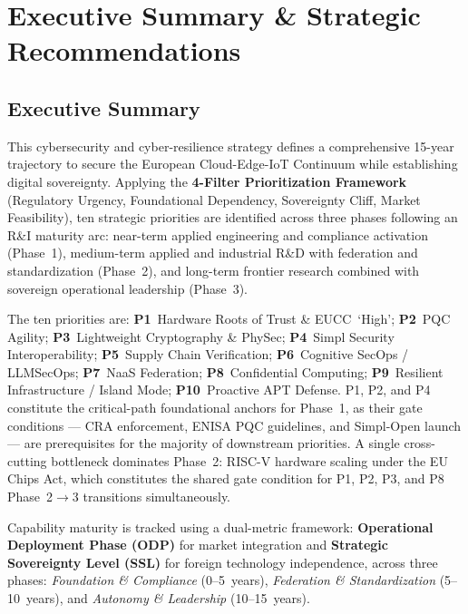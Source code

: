 \section{Executive Summary \& Strategic Recommendations}
\label{sec:exec_summary}
\label{sec:executive_summary}

\subsection*{Executive Summary}

This cybersecurity and cyber-resilience strategy defines a comprehensive
15-year trajectory to secure the European Cloud-Edge-IoT Continuum while
establishing digital sovereignty. Applying the \textbf{4-Filter
Prioritization Framework} (Regulatory Urgency, Foundational Dependency,
Sovereignty Cliff, Market Feasibility), ten strategic priorities are
identified across three phases following an R\&I maturity arc: near-term
applied engineering and compliance activation (Phase~1), medium-term
applied and industrial R\&D with federation and standardization (Phase~2),
and long-term frontier research combined with sovereign operational
leadership (Phase~3).

The ten priorities are: \textbf{P1}~Hardware Roots of Trust \& EUCC~`High';
\textbf{P2}~PQC Agility; \textbf{P3}~Lightweight Cryptography \& PhySec;
\textbf{P4}~Simpl Security Interoperability; \textbf{P5}~Supply Chain
Verification; \textbf{P6}~Cognitive SecOps / LLMSecOps; \textbf{P7}~NaaS
Federation; \textbf{P8}~Confidential Computing; \textbf{P9}~Resilient
Infrastructure / Island Mode; \textbf{P10}~Proactive APT Defense.
P1, P2, and P4 constitute the critical-path foundational anchors for
Phase~1, as their gate conditions --- CRA enforcement, ENISA PQC guidelines,
and Simpl-Open launch --- are prerequisites for the majority of downstream
priorities. A single cross-cutting bottleneck dominates Phase~2: RISC-V
hardware scaling under the EU Chips Act, which constitutes the shared gate
condition for P1, P2, P3, and P8 Phase~2$\to$3 transitions simultaneously.

Capability maturity is tracked using a dual-metric framework:
\textbf{Operational Deployment Phase (ODP)} for market integration and
\textbf{Strategic Sovereignty Level (SSL)} for foreign technology
independence, across three phases: \emph{Foundation \& Compliance}
(0--5~years), \emph{Federation \& Standardization} (5--10~years), and
\emph{Autonomy \& Leadership} (10--15~years).

